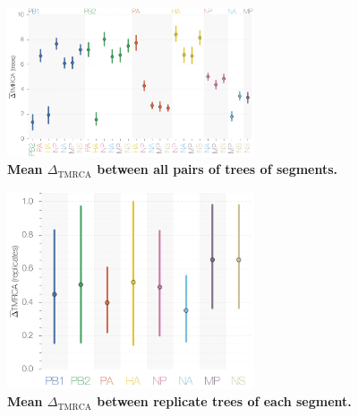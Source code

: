 \documentclass[11pt,oneside,letterpaper]{article}
\newcommand{\dtmrca}{\Delta_\mathrm{TMRCA}}
\begin{document}

\begin{figure}
\centering  
\includegraphics[width=0.65\textwidth]  {supp_figures/InfB_supp_deltaTMRCA_trees.png}
\caption{\textbf{Mean $\dtmrca$ between all pairs of trees of segments.}}
\label{deltaTMRCAtrees}
\end{figure}

\begin{figure}
\centering  
\includegraphics[width=0.65\textwidth]  {supp_figures/InfB_supp_deltaTMRCA_replicates.png}
\caption{\textbf{Mean $\dtmrca$ between replicate trees of each segment.}}
\label{deltaTMRCAreplicates}
\end{figure}
\end{document}
